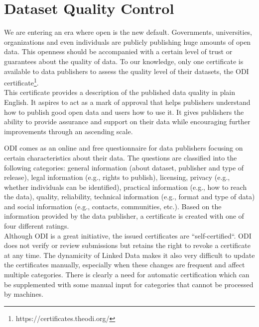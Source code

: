 \documentclass[onecolumn, crcready]{iosart2c}
\begin{document}

\section{Dataset Quality Control}

We are entering an era where open is the new default. Governments, universities, organizations and even individuals are publicly publishing huge amounts of open data.  This openness should be accompanied with a certain level of trust or guarantees about the quality of data.  To our knowledge, only one certificate is available to data publishers to assess the quality level of their datasets, the ODI certificate\footnote {https://certificates.theodi.org/}.\\

This certificate provides a description of the published data quality in plain English. It aspires to act as a mark of approval that helps publishers understand how to publish good open data and users how to use it. It gives publishers the ability to provide assurance and support on their data while encouraging further improvements through an ascending scale.

ODI comes as an online and free questionnaire for data publishers focusing on certain characteristics about their data. The questions are classified into the following categories: general information (about dataset, publisher and type of release), legal information (e.g., rights to publish), licensing, privacy (e.g., whether individuals can be identified), practical information (e.g., how to reach the data), quality, reliability, technical information (e.g., format and type of data) and social information (e.g., contacts, communities, etc.). Based on the information provided  by the data  publisher,  a certificate  is created  with one of four different ratings.\\

Although ODI is a great initiative, the issued certificates are “self-certified“. ODI does not verify or review submissions but retains the right to revoke a certificate at any time. The dynamicity of Linked Data  makes it also very difficult to update the certificates manually, especially when these changes are frequent and affect multiple categories. There is clearly a need for automatic certification which can be supplemented with some manual input for categories that cannot be processed by machines.\\
\end{document}
